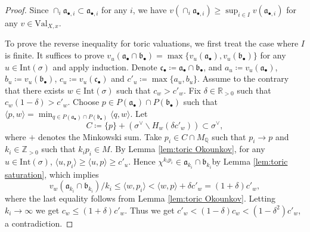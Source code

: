 \documentclass[11pt, leqno]{amsart}%
\theoremstyle{plain}
\theoremstyle{definition}
\theoremstyle{remark}
\newcommand{\bQ}{\mathbb{Q}}
\newcommand{\bR}{\mathbb{R}}
\newcommand{\bZ}{\mathbb{Z}}
\newcommand{\fa}{\mathfrak{a}}
\newcommand{\fb}{\mathfrak{b}}
\newcommand{\fc}{\mathfrak{c}}
\newcommand{\Int}{\mathrm{Int}}
\newcommand{\Val}{\mathrm{Val}}
\numberwithin{equation}{section}
\begin{document}
\begin{proof}
    Since $\cap_i\fa_{\bullet,i}\subset\fa_{\bullet,i}$ for any $i$, we have $v(\cap_i\fa_{\bullet,i})\ge \sup_{i\in I}v(\fa_{\bullet,i})$ for any $v\in\Val_{X,x}$. 

    To prove the reverse inequality for toric valuations, we first treat the case where $I$ is finite. It suffices to prove $v_u(\fa_\bullet\cap\fb_\bullet)=\max\{v_u(\fa_\bullet),v_u(\fb_\bullet)\}$ for any $u\in\Int(\sigma)$ and apply induction. Denote $\fc_\bullet\coloneqq\fa_\bullet\cap\fb_\bullet$, and $a_u\coloneqq v_u(\fa_\bullet)$, $b_u\coloneqq v_u(\fb_\bullet)$, $c_u\coloneqq v_u(\fc_\bullet)$ and $c'_u\coloneqq\max\{a_u,b_u\}$. Assume to the contrary that there exists $w\in\Int(\sigma)$ such that $c_w>c'_w$. Fix $\delta\in\bR_{>0}$ such that $c_w(1-\delta)>c'_w$. Choose $p\in P(\fa_\bullet)\cap P(\fb_\bullet)$ such that $\langle p,w \rangle=\min_{q\in P(\fa_\bullet)\cap P(\fb_\bullet)}\langle q,w \rangle$. Let
    \[
        C\coloneqq \{p\}+(\sigma^\vee\backslash H_w(\delta c'_w))\subset \sigma^\vee,
    \]
    where $+$ denotes the Minkowski sum. Take $p_i\in C\cap M_\bQ$ such that $p_i\to p$ and $k_i\in\bZ_{>0}$ such that $k_ip_i\in M$. By Lemma \ref{lem:toric Okounkov}, for any $u\in\Int(\sigma)$, $\langle u,p_i \rangle \ge \langle u,p \rangle\ge c'_u$. Hence $\chi^{k_ip_i}\in\fa_{k_i}\cap\fb_{k_i}$by Lemma \ref{lem:toric saturation}, which implies
    \[
        v_w(\fa_{k_i}\cap\fb_{k_i})/k_i\le \langle w,p_i \rangle< \langle w,p \rangle+\delta c'_w = (1+\delta)c'_w,
    \]
    where the last equality follows from Lemma \ref{lem:toric Okounkov}. Letting $k_i\to\infty$ we get $c_w\le (1+\delta)c'_w$. Thus we get $c'_w<(1-\delta)c_w<(1-\delta^2)c'_w$, a contradiction. 


\end{proof}
\end{document}
